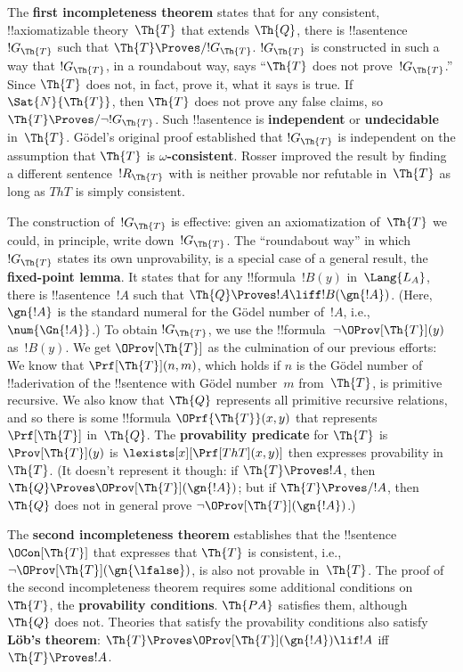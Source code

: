 The \textbf{first incompleteness theorem} states that for any
consistent, !!{axiomatizable} theory~$\Th{T}$ that extends $\Th{Q}$,
there is !!a{sentence}~$!G_\Th{T}$ such that $\Th{T} \Proves/
!G_\Th{T}$. $!G_\Th{T}$ is constructed in such a way that $!G_\Th{T}$,
in a roundabout way, says ``$\Th{T}$ does not prove~$!G_\Th{T}$.''
Since $\Th{T}$ does not, in fact, prove it, what it says is true. If
$\Sat{N}{\Th{T}}$, then $\Th{T}$ does not prove any false claims, so
$\Th{T} \Proves/ \lnot !G_\Th{T}$. Such !!a{sentence} is
\textbf{independent} or \textbf{undecidable} in~$\Th{T}$.  G\"odel's
original proof established that $!G_\Th{T}$ is independent on the
assumption that $\Th{T}$ is \textbf{$\omega$-consistent}. Rosser
improved the result by finding a different sentence~$!R_\Th{T}$ with
is neither provable nor refutable in~$\Th{T}$ as long as $Th{T}$ is
simply consistent.

The construction of~$!G_\Th{T}$ is effective: given an axiomatization
of~$\Th{T}$ we could, in principle, write down~$!G_\Th{T}$. The
``roundabout way'' in which $!G_\Th{T}$ states its own unprovability,
is a special case of a general result, the \textbf{fixed-point
  lemma}. It states that for any !!{formula}~$!B(y)$ in~$\Lang{L_A}$,
there is !!a{sentence}~$!A$ such that $\Th{Q} \Proves !A \liff
!B(\gn{!A})$. (Here, $\gn{!A}$ is the standard numeral for the G\"odel
number of~$!A$, i.e., $\num{\Gn{!A}}$.)  To obtain $!G_\Th{T}$, we use
the !!{formula}~$\lnot\OProv[\Th{T}](y)$ as~$!B(y)$.  We get
$\OProv[\Th{T}]$ as the culmination of our previous efforts: We know
that $\Prf[\Th{T}](n, m)$, which holds if $n$ is the G\"odel number of
!!a{derivation} of the !!{sentence} with G\"odel number~$m$
from~$\Th{T}$, is primitive recursive. We also know that $\Th{Q}$
represents all primitive recursive relations, and so there is some
!!{formula} $\OPrf{\Th{T}}(x,y)$ that represents~$\Prf[\Th{T}]$
in~$\Th{Q}$.  The \textbf{provability predicate} for $\Th{T}$ is
$\Prov[\Th{T}](y)$ is $\lexists[x][\Prf[Th{T}](x, y)]$ then expresses
provability in~$\Th{T}$. (It doesn't represent it though: if $\Th{T}
\Proves !A$, then $\Th{Q} \Proves \OProv[\Th{T}](\gn{!A})$; but if
$\Th{T} \Proves/ !A$, then $\Th{Q}$ does not in general prove $\lnot
\OProv[\Th{T}](\gn{!A})$.)

The \textbf{second incompleteness theorem} establishes that the
!!{sentence}~$\OCon[\Th{T}]$ that expresses that $\Th{T}$ is
consistent, i.e., $\lnot \OProv[\Th{T}](\gn{\lfalse})$, is also not
provable in~$\Th{T}$.  The proof of the second incompleteness theorem
requires some additional conditions on~$\Th{T}$, the
\textbf{provability conditions}. $\Th{PA}$ satisfies them,
although~$\Th{Q}$ does not.  Theories that satisfy the provability
conditions also satisfy \textbf{L\"ob's theorem}: $\Th{T} \Proves
\OProv[\Th{T}](\gn{!A}) \lif !A$ iff $\Th{T} \Proves !A$.

